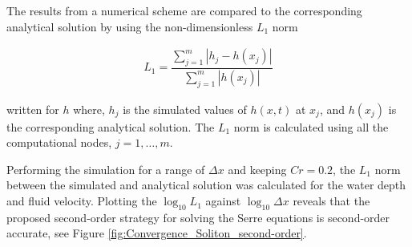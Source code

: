 \documentclass[SingleSpace,12pt]{Serre_ASCE}
\begin{document}
The results from a numerical scheme are compared to the corresponding analytical solution by using the non-dimensionless $L_1$ norm
\begin{linenomath*}
\begin{gather}
L_1 = \dfrac{\sum_{j=1}^m |h_j - h(x_j)|}{\sum_{j=1}^m |h(x_j)|}
\label{eq:Li_norm}
\end{gather}
\end{linenomath*}
written for $h$ where, $h_j$ is the simulated values of $h(x,t)$ at $x_j$, and $h(x_j)$ is the corresponding analytical solution. The $L_1$ norm is calculated using all the computational nodes, $j = 1,\ldots, m$.

Performing the simulation for a range of $\Delta x$ and keeping $Cr = 0.2$, the $L_1$ norm between the simulated and analytical solution was calculated for the water depth and fluid velocity. Plotting the $\log_{10}L_1$ against $\log_{10}\Delta x$ reveals that the proposed second-order strategy for solving the Serre equations is second-order accurate, see Figure \ref{fig:Convergence_Soliton_second-order}.
\end{document}
